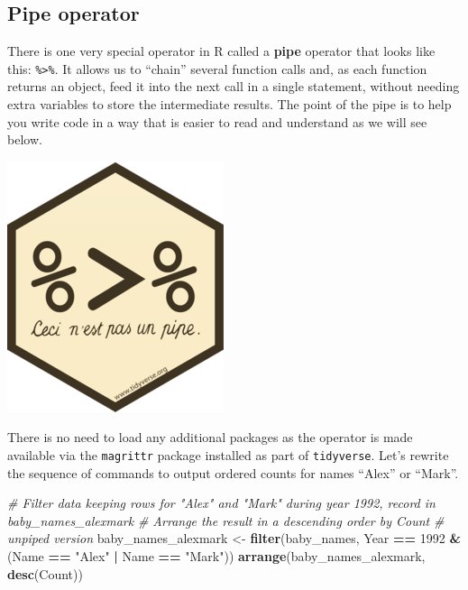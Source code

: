 \documentclass[
]{book}
\newenvironment{Shaded}{\begin{snugshade}}{\end{snugshade}}
\newcommand{\CommentTok}[1]{\textcolor[rgb]{0.56,0.35,0.01}{\textit{#1}}}
\newcommand{\DecValTok}[1]{\textcolor[rgb]{0.00,0.00,0.81}{#1}}
\newcommand{\KeywordTok}[1]{\textcolor[rgb]{0.13,0.29,0.53}{\textbf{#1}}}
\newcommand{\NormalTok}[1]{#1}
\newcommand{\OperatorTok}[1]{\textcolor[rgb]{0.81,0.36,0.00}{\textbf{#1}}}
\newcommand{\StringTok}[1]{\textcolor[rgb]{0.31,0.60,0.02}{#1}}
\begin{document}
\hypertarget{pipe-operator}{%
\subsection{Pipe operator}\label{pipe-operator}}

There is one very special operator in R called a \textbf{pipe} operator that looks like this: \texttt{\%\textgreater{}\%}. It allows us to ``chain'' several function calls and, as each function returns an object, feed it into the next call in a single statement, without needing extra variables to store the intermediate results. The point of the pipe is to help you write code in a way that is easier to read and understand as we will see below.

\includegraphics{R/Rintro/images/magrittr.png}

There is no need to load any additional packages as the operator is made available via the \texttt{magrittr} package installed as part of \texttt{tidyverse}. Let's rewrite the sequence of commands to output ordered counts for names ``Alex'' or ``Mark''.

\begin{Shaded}
\begin{Highlighting}[]
\CommentTok{\# Filter data keeping rows for "Alex" and "Mark" during year 1992, record in baby\_names\_alexmark}
\CommentTok{\# Arrange the result in a descending order by Count}
\CommentTok{\# unpiped version}
\NormalTok{baby\_names\_alexmark \textless{}{-}}\StringTok{ }\KeywordTok{filter}\NormalTok{(baby\_names, Year }\OperatorTok{==}\StringTok{ }\DecValTok{1992} \OperatorTok{\&}\StringTok{ }\NormalTok{(Name }\OperatorTok{==}\StringTok{ "Alex"} \OperatorTok{|}\StringTok{ }\NormalTok{Name }\OperatorTok{==}\StringTok{ "Mark"}\NormalTok{))}
\KeywordTok{arrange}\NormalTok{(baby\_names\_alexmark, }\KeywordTok{desc}\NormalTok{(Count))}
\end{Highlighting}
\end{Shaded}
\end{document}
